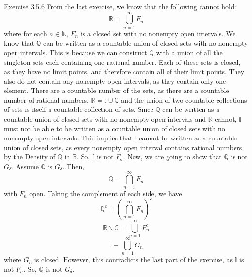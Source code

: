 \documentclass{exam}
\begin{document}
\underline{Exercise 3.5.6}
\newline
\newline
From the last exercise, we know that the following cannot hold:
\[\mathbb{R}=\bigcup_{n=1}^\infty F_n\]
where for each $n\in \mathbb{N}$, $F_n$ is a closed set with no nonempty open intervals. We know that $\mathbb{Q}$ can be written as a countable union of closed sets with no nonempty open intervals. This is because we can construct $\mathbb{Q}$ with a union of all the singleton sets each containing one rational number. Each of these sets is closed, as they have no limit points, and therefore contain all of their limit points. They also do not contain any nonempty open intervals, as they contain only one element. There are a countable number of the sets, as there are a countable number of rational numbers. $\mathbb{R}=\mathbb{I}\cup \mathbb{Q}$ and the union of two countable collections of sets is itself a countable collection of sets. Since $\mathbb{Q}$ can be written as a countable union of closed sets with no nonempty open intervals and $\mathbb{R}$ cannot, $\mathbb{I}$ must not be able to be written as a countable union of closed sets with no nonempty open intervals. This implies that $\mathbb{I}$ cannot be written as a countable union of closed sets, as every nonempty open interval contains rational numbers by the Density of $\mathbb{Q}$ in $\mathbb{R}$. So, $\mathbb{I}$ is not $F_\sigma$.
\newline
\newline
Now, we are going to show that $\mathbb{Q}$ is not $G_\delta$. Assume $\mathbb{Q}$ is $G_\delta$. Then,
\[\mathbb{Q}=\bigcap_{n=1}^\infty F_n\]
with $F_n$ open. Taking the complement of each side, we have
\[\mathbb{Q}^c=(\bigcap_{n=1}^\infty F_n)^c\]
\[\mathbb{R}\backslash\mathbb{Q}=\bigcup_{n=1}^\infty F_n^c\]
\[\mathbb{I}=\bigcup_{n=1}^\infty G_n\]
where $G_n$ is closed. However, this contradicts the last part of the exercise, as $\mathbb{I}$ is not $F_\sigma$. So, $\mathbb{Q}$ is not $G_\delta$.
\newline
\end{document}
